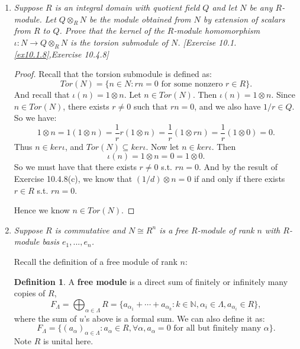 \documentclass[12pt]{amsbook}
\theoremstyle{plain}
\numberwithin{section}{chapter}
\numberwithin{equation}{chapter}
\theoremstyle{definition}
\newtheorem{Def}[theorem]{Definition}
\theoremstyle{remark}
\newcommand{\sub}{\subseteq}
\newcommand{\n}{\mathbb{N}}
\newcommand{\fracc}{\frac}
\newcommand{\tens}{\otimes}
\begin{document}
\begin{enumerate}[label=\arabic*.]
\begin{enumerate}
\end{enumerate}








\item \textit{Suppose $R$ is an integral domain with quotient field $Q$ and let $N$ be any $R$-module. Let $Q \tens_R N$ be the module obtained from $N$ by extension of scalars from $R$ to $Q$. Prove that the kernel of the $R$-module homomorphism $\iota: N \to Q \tens_R N$ is the torsion submodule of $N$. [Exercise 10.1.\ref{ex10.1.8},Exercise 10.4.8]}

\begin{proof}
Recall that the torsion submodule is defined as: 
$$
Tor(N) = \{n \in N:rn = 0 \text{ for some nonzero } r \in R\}. 
$$
And recall that $\iota(n) = 1 \tens n$. Let $n \in Tor(N)$. Then $\iota(n) = 1 \tens n$. Since $n \in Tor(N)$, there exists $r \neq 0$ such that $rn = 0$, and we also have $1/r \in Q$. So we have: 
$$
1 \tens n = 1(1 \tens n) = \fracc{1}{r}r(1 \tens n) = \frac{1}{r}(1 \tens rn) = \fracc{1}{r}(1 \tens 0) = 0.
$$
Thus $n \in ker\iota$, and $Tor(N) \sub ker \iota$. Now let $n \in ker\iota$. Then
$$
\iota(n) = 1 \tens n = 0 = 1 \tens 0. 
$$ 
So we must have that there exists $r \neq 0$ s.t. $rn = 0$. And by the result of Exercise 10.4.8(c), we know that $(1/d) \tens n = 0$ if and only if there exists $r \in R$ s.t. $rn = 0$. 
\begin{comment} Then we would have:
$$
1 \tens n = \fracc{1}{r}r \tens n = \fracc{1}{r}\tens rn = \fracc{1}{r}\tens 0 = 0 = 1 \tens 0.
$$
\end{comment}
Hence we know $n \in Tor(N)$. 
\end{proof}

\item \textit{Suppose $R$ is commutative and $N \cong R^n$ is a free $R$-module of rank $n$ with $R$-module basis $e_1,...,e_n$. }

Recall the definition of a free module of rank $n$: 
\begin{Def}
A \textbf{free module} is a direct sum of finitely or infinitely many copies of $R$, 
$$
F_\Lambda = \bigoplus_{\alpha \in \Lambda}R = \{a_{\alpha_1} + \cdots + a_{\alpha_k}: k \in \n,\alpha_i \in \Lambda,a_{\alpha_i} \in R\},
$$
where the sum of $u$'s above is a formal sum. We can also define it as: 
$$
F_\Lambda = \{(a_\alpha)_{\alpha \in \Lambda}: a_\alpha \in R,\forall \alpha,a_\alpha = 0 \text{ for all but finitely many }\alpha\}.
$$
Note $R$ is unital here. 
\end{Def}


\end{enumerate}
\end{document}
